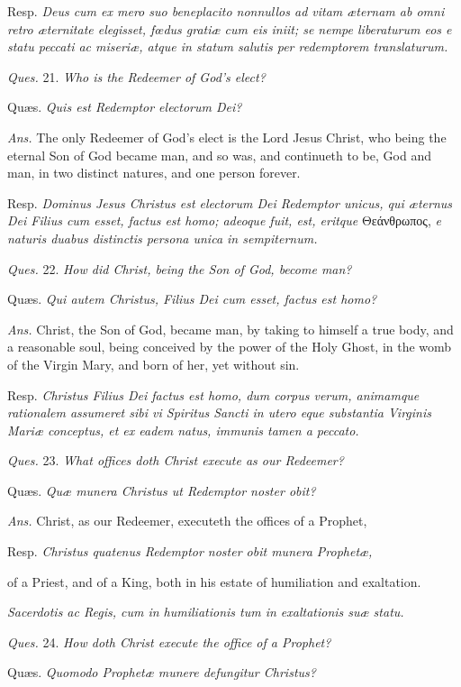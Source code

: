Resp. \emph{Deus cum ex mero suo beneplacito nonnullos ad vitam æternam ab omni retro æternitate elegisset, fœdus gratiæ cum eis iniit; se nempe liberaturum eos e statu peccati ac miseriæ, atque in statum salutis per redemptorem translaturum.}

\emph{Ques.} 21. \emph{Who is the Redeemer of God's elect?}

Quæs. \emph{Quis est Redemptor electorum Dei?}

\emph{Ans.} The only Redeemer of God's elect is the Lord Jesus Christ, who being the eternal Son of God became man, and so was, and continueth to be, God and man, in two distinct natures, and one person forever.

Resp. \emph{Dominus Jesus Christus est electorum Dei Redemptor unicus, qui æternus Dei Filius cum esset, factus est homo; adeoque fuit, est, eritque } \textgreek{Θεάνθρωπος}, \emph{e naturis duabus distinctis persona unica in sempiternum.}

\emph{Ques.} 22. \emph{How did Christ, being the Son of God, become man?}

Quæs. \emph{Qui autem Christus, Filius Dei cum esset, factus est homo?}

\emph{Ans.} Christ, the Son of God, became man, by taking to himself a true body, and a reasonable soul, being conceived by the power of the Holy Ghost, in the womb of the Virgin Mary, and born of her, yet without sin.

Resp. \emph{Christus Filius Dei factus est homo, dum corpus verum, animamque rationalem assumeret sibi vi Spiritus Sancti in utero eque substantia Virginis Mariæ conceptus, et ex eadem natus, immunis tamen a peccato.}

\emph{Ques.} 23. \emph{What offices doth Christ execute as our Redeemer?}

Quæs. \emph{Quæ munera Christus ut Redemptor noster obit?}

\emph{Ans.} Christ, as our Redeemer, executeth the offices of a Prophet,

Resp. \emph{Christus quatenus Redemptor noster obit munera Prophetæ, }

of a Priest, and of a King, both in his estate of humiliation and exaltation.

\emph{Sacerdotis ac Regis, cum in humiliationis tum in exaltationis suæ statu.}

\emph{Ques.} 24. \emph{How doth Christ execute the office of a Prophet?}

Quæs. \emph{Quomodo Prophetæ munere defungitur Christus?}

